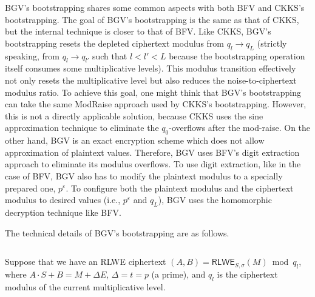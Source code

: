 BGV's bootstrapping shares some common aspects with both BFV and CKKS's bootstrapping. The goal of BGV's bootstrapping is the same as that of CKKS, but the internal technique is closer to that of BFV. Like CKKS, BGV's bootstrapping resets the depleted ciphertext modulus from $q_l \rightarrow q_L$ (strictly speaking, from $q_l \rightarrow q_{l'}$ such that $l < l' < L$ because the bootstrapping operation itself consumes some multiplicative levels). This modulus transition effectively not only resets the multiplicative level but also reduces the noise-to-ciphertext modulus ratio. To achieve this goal, one might think that BGV's bootstrapping can take the same \textsf{ModRaise} approach used by CKKS's bootstrapping. However, this is not a directly applicable solution, because CKKS uses the sine approximation technique to eliminate the $q_0$-overflows after the mod-raise. On the other hand, BGV is an exact encryption scheme which does not allow approximation of plaintext values. Therefore, BGV uses BFV's digit extraction approach to eliminate its modulus overflows. To use digit extraction, like in the case of BFV, BGV also has to modify the plaintext modulus to a specially prepared one, $p^\varepsilon$. To configure both the plaintext modulus and the ciphertext modulus to desired values (i.e., $p^\varepsilon$ and $q_L$), BGV uses the homomorphic decryption technique like BFV.  


The technical details of BGV's bootstrapping are as follows. 

$ $

Suppose that we have an RLWE ciphertext $(A, B)  = \textsf{RLWE}_{S, \sigma}(M) \bmod q_l$, where $A\cdot S + B = M + \Delta E$, \text{ } $\Delta = t = p$ (a prime), and $q_l$ is the ciphertext modulus of the current multiplicative level. 

$ $

